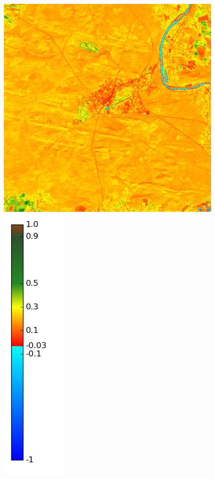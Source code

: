 \documentclass{book}
\begin{document}
\begin{figure}[H]
\centerline{
\includegraphics[scale=0.2]{images/Fontainebleau/03_ndvi.png}
\includegraphics[scale=0.2]{images/colormap.png}
}
\end{figure}
\end{document}

